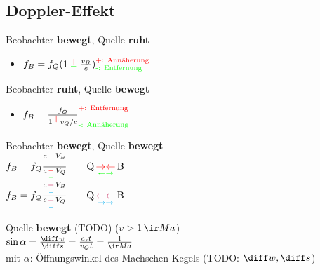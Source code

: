 \begin{sectionbox}
    \subsection{Doppler-Effekt}
    \begin{cookbox}{}
        \item Beobachter \textbf{bewegt}, Quelle \textbf{ruht}\\
        \begin{itemize}
            \item[] $f_B=f_Q(1\cpm\frac{v_B}{c})^{\textcolor{red}{\text{+: Annäherung}}}_{\textcolor{green}{\text{-: Entfernung}}}$\\
        \end{itemize}
        \item Beobachter \textbf{ruht}, Quelle \textbf{bewegt}\\
        \begin{itemize}
            \item[] $f_B=\frac{f_Q}{1\cpm v_Q/c}^{\textcolor{red}{\text{+: Entfernung}}}_{\textcolor{green}{\text{-: Annäherung}}}$\\
        \end{itemize}
        \item Beobachter \textbf{bewegt}, Quelle \textbf{bewegt}\\
        $f_B = f_Q \frac{c \, \underset{\textcolor{green}{-}}{\textcolor{red}{+}} \, V_B}{c \, \underset{\textcolor{green}{+}}{\textcolor{red}{-}} \, V_Q} \qquad \text{Q} \, \underset{\textcolor{green}{\leftarrow} \textcolor{green}{\rightarrow}}{\textcolor{red}{\rightarrow} \textcolor{red}{\leftarrow}} \, \text{B}$\\
        $f_B = f_Q \frac{c \, \underset{\textcolor{cyan}{-}}{\textcolor{purple}{+}} \, V_B}{c \, \underset{\textcolor{cyan}{-}}{\textcolor{purple}{+}} \, V_Q} \qquad \text{Q} \, \underset{\textcolor{cyan}{\rightarrow} \textcolor{cyan}{\rightarrow}}{\textcolor{purple}{\leftarrow} \textcolor{purple}{\leftarrow}} \, \text{B}$\\
        \item Quelle \textbf{bewegt} (TODO) ($v>1 \, \ir Ma$)\\
        $\sin \alpha=\frac{\diff w}{\diff s}=\frac{c_s t}{v_Qt}=\frac{1}{\ir Ma}$ \\
        mit $\alpha$: Öffnungswinkel des Machschen Kegels (TODO: $\diff w, \diff s$)
    \end{cookbox}
\end{sectionbox}

